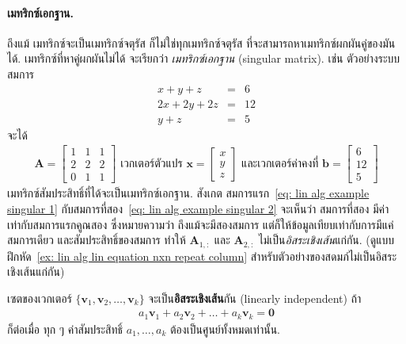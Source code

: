 \paragraph{เมทริกซ์เอกฐาน.}
ถึงแม้ เมทริกซ์จะเป็นเมทริกซ์จตุรัส
ก็ไม่ใช่ทุกเมทริกซ์จตุรัส ที่จะสามารถหาเมทริกซ์ผกผันคู่ของมันได้.
เมทริกซ์ที่หาคู่ผกผันไม่ได้ จะเรียกว่า \textit{เมทริกซ์เอกฐาน} (singular matrix).
เช่น ตัวอย่างระบบสมการ
\begin{eqnarray}
x + y + z &=& 6 
\label{eq: lin alg example singular 1} \\
2 x + 2 y + 2 z &=& 12
\label{eq: lin alg example singular 2} \\
y + z &=& 5
\label{eq: lin alg example singular 3}
\end{eqnarray}
จะได้ 
\begin{eqnarray}
\bm{A} = 
\begin{bmatrix}
1 & 1 & 1 \\
2 & 2 & 2 \\
0 & 1 & 1 
\end{bmatrix}
\mbox{ เวกเตอร์ตัวแปร }
%
\bm{x} = 
\begin{bmatrix}
x \\
y \\
z
\end{bmatrix}
\mbox{ และเวกเตอร์ค่าคงที่ }
\bm{b} =
\begin{bmatrix}
6 \\
12 \\
5
\end{bmatrix}
\nonumber
\end{eqnarray}
เมทริกซ์สัมประสิทธิ์ที่ได้จะเป็นเมทริกซ์เอกฐาน.
สังเกต สมการแรก~\ref{eq: lin alg example singular 1} กับสมการที่สอง~\ref{eq: lin alg example singular 2}
จะเห็นว่า
สมการที่สอง มีค่าเท่ากับสมการแรกคูณสอง
ซึ่งหมายความว่า ถึงแม้จะมีสองสมการ
แต่ก็ให้ข้อมูลเทียบเท่ากับการมีแค่สมการเดียว
และสัมประสิทธิ์ของสมการ ทำให้ $\bm{A}_{1,:}$ และ
$\bm{A}_{2,:}$ ไม่เป็น\textit{อิสระเชิงเส้น}แก่กัน.
(ดูแบบฝึกหัด~\ref{ex: lin alg lin equation nxn repeat column} สำหรับตัวอย่างของสดมภ์ไม่เป็นอิสระเชิงเส้นแก่กัน)

เซตของเวกเตอร์ $\{\bm{v}_1, 
\bm{v}_2,
\ldots,
\bm{v}_k\}$
จะเป็น\textbf{อิสระเชิงเส้น}กัน (linearly independent) 
ถ้า
\begin{eqnarray}
a_1 \bm{v}_1 + 
a_2 \bm{v}_2 +
\ldots +
a_k \bm{v}_k
=
\bm{0}
\nonumber
\end{eqnarray}
ก็ต่อเมื่อ
ทุก ๆ ค่าสัมประสิทธิ์ $a_1, \ldots, a_k$ ต้องเป็นศูนย์ทั้งหมดเท่านั้น.

